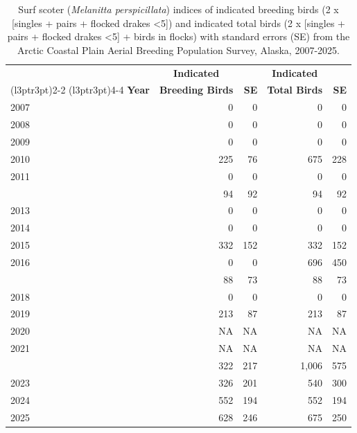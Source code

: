 \documentclass[
]{article}
\begin{document}
\begin{longtable}[t]{lrrrr}

\caption{\label{tbl-SUSC}Surf scoter (\emph{Melanitta perspicillata})
indices of indicated breeding birds (2 x {[}singles + pairs + flocked
drakes \textless5{]}) and indicated total birds (2 x {[}singles + pairs
+ flocked drakes \textless5{]} + birds in flocks) with standard errors
(SE) from the Arctic Coastal Plain Aerial Breeding Population Survey,
Alaska, 2007-2025.}

\tabularnewline

\\
\toprule
\multicolumn{1}{c}{\textbf{ }} & \multicolumn{1}{c}{\textbf{Indicated}} & \multicolumn{1}{c}{\textbf{ }} & \multicolumn{1}{c}{\textbf{Indicated}} & \multicolumn{1}{c}{\textbf{ }} \\
\cmidrule(l{3pt}r{3pt}){2-2} \cmidrule(l{3pt}r{3pt}){4-4}
\textbf{Year} & \textbf{Breeding Birds} & \textbf{SE} & \textbf{Total Birds} & \textbf{SE}\\
\midrule
2007 & 0 & 0 & 0 & 0\\
2008 & 0 & 0 & 0 & 0\\
2009 & 0 & 0 & 0 & 0\\
2010 & 225 & 76 & 675 & 228\\
2011 & 0 & 0 & 0 & 0\\
\addlinespace
2012 & 94 & 92 & 94 & 92\\
2013 & 0 & 0 & 0 & 0\\
2014 & 0 & 0 & 0 & 0\\
2015 & 332 & 152 & 332 & 152\\
2016 & 0 & 0 & 696 & 450\\
\addlinespace
2017 & 88 & 73 & 88 & 73\\
2018 & 0 & 0 & 0 & 0\\
2019 & 213 & 87 & 213 & 87\\
2020 & NA & NA & NA & NA\\
2021 & NA & NA & NA & NA\\
\addlinespace
2022 & 322 & 217 & 1,006 & 575\\
2023 & 326 & 201 & 540 & 300\\
2024 & 552 & 194 & 552 & 194\\
2025 & 628 & 246 & 675 & 250\\
\bottomrule

\end{longtable}

\endgroup{}

\newpage{}
\end{document}
